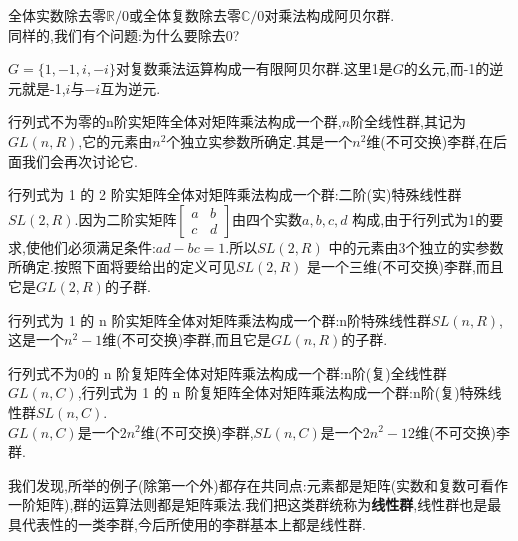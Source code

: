 \begin{example}
    全体实数除去零$\mathbb{R}/0$或全体复数除去零$\mathbb{C}/0$对乘法构成阿贝尔群.\\
    同样的,我们有个问题:为什么要除去0?
\end{example}
\begin{example}
    $G =\{1,-1,i,-i\}$对复数乘法运算构成一有限阿贝尔群.这里1是$G$的幺元,而-1的逆元就是-1,$i$与$-i$互为逆元.
\end{example}
\begin{example}
    行列式不为零的n阶实矩阵全体对矩阵乘法构成一个群,$n$阶全线性群,其记为$GL(n,R)$,它的元素由$n^2$个独立实参数所确定.其是一个$n^2$维(不可交换)李群,在后面我们会再次讨论它.
\end{example}
\begin{example}
    行列式为 1 的 2 阶实矩阵全体对矩阵乘法构成一个群:二阶(实)特殊线性群$SL(2,R)$.因为二阶实矩阵$\begin{bmatrix}a&b\\c&d\end{bmatrix}$由四个实数$a,b,c,d$ 构成,由于行列式为1的要求,使他们必须满足条件:$ad-bc=1$.所以$SL(2,R)$ 中的元素由3个独立的实参数所确定.按照下面将要给出的定义可见$SL(2,R)$ 是一个三维(不可交换)李群,而且它是$GL(2,R)$的子群.
\end{example}
\begin{example}
    行列式为 1 的 n 阶实矩阵全体对矩阵乘法构成一个群:n阶特殊线性群$SL(n,R)$,这是一个$n^2-1$维(不可交换)李群,而且它是$GL(n,R)$的子群.
\end{example}
\begin{example}
    行列式不为0的 n 阶复矩阵全体对矩阵乘法构成一个群:n阶(复)全线性群$GL(n,C)$,行列式为 1 的 n 阶复矩阵全体对矩阵乘法构成一个群:n阶(复)特殊线性群$SL(n,C)$.\\
    $GL(n,C)$是一个$2n^2$维(不可交换)李群,$SL(n,C)$是一个$2n^2-12$维(不可交换)李群.
\end{example}

我们发现,所举的例子(除第一个外)都存在共同点:元素都是矩阵(实数和复数可看作一阶矩阵),群的运算法则都是矩阵乘法.我们把这类群统称为\textbf{线性群},线性群也是最具代表性的一类李群,今后所使用的李群基本上都是线性群.

